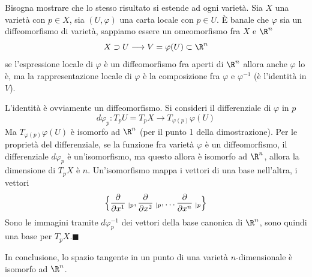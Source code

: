 \documentclass[10pt, letterpaper]{report}
\begin{document}
\noindent{} Bisogna mostrare che lo stesso risultato si estende ad ogni varietà. Sia $X$ una varietà con $p\in X$, sia $(U,\varphi)$ una carta locale con $p\in U$. È banale che $\varphi$ sia un diffeomorfismo di varietà, sappiamo essere un omeomorfismo fra $X$ e $\R^n$\begin{equation}
    X\supset U \longrightarrow V=\varphi(U)\subset\R^n
\end{equation}
se l'espressione locale di $\varphi$ è un diffeomorfismo fra aperti di $\R^n$ allora anche $\varphi$ lo è, ma la rappresentazione locale di $\varphi$ è la composizione fra $\varphi$ e $\varphi^{-1}$ (è l'identità in $V$).
\begin{center}
\end{center}
L'identità è ovviamente un diffeomorfismo. Si consideri il differenziale di $\varphi$ in $p$\begin{equation}
    d\varphi_p:T_pU=T_pX\longrightarrow T_{\varphi(p)}\varphi(U)
\end{equation}
Ma $T_{\varphi(p)}\varphi(U)$ è isomorfo ad $\R^n$ (per il punto 1 della dimostrazione). Per le proprietà del differenziale, se la funzione fra varietà $\varphi$ è un diffeomorfismo, il differenziale $d\varphi_p$ è un'isomorfismo, ma questo allora è isomorfo ad $\R^n$, allora la dimensione di $T_pX$ è $n$. Un'isomorfismo mappa i vettori di una base nell'altra, i vettori \begin{equation}
        \Big\{\frac{\partial}{\partial x^1}\hphantom{.}_{|p},
        \frac{\partial}{\partial x^2}\hphantom{.}_{|p},\dots
        \frac{\partial}{\partial x^n}\hphantom{.}_{|p}\Big\}
    \end{equation} 
Sono le immagini tramite $d\varphi_p^{-1}$ dei vettori della base canonica di $\R^n$, sono quindi una base per $T_pX$.\hfill$\blacksquare$\bigskip


\noindent In conclusione, lo spazio tangente in un punto di una varietà $n$-dimensionale è isomorfo ad $\R^n$.
\end{document}
